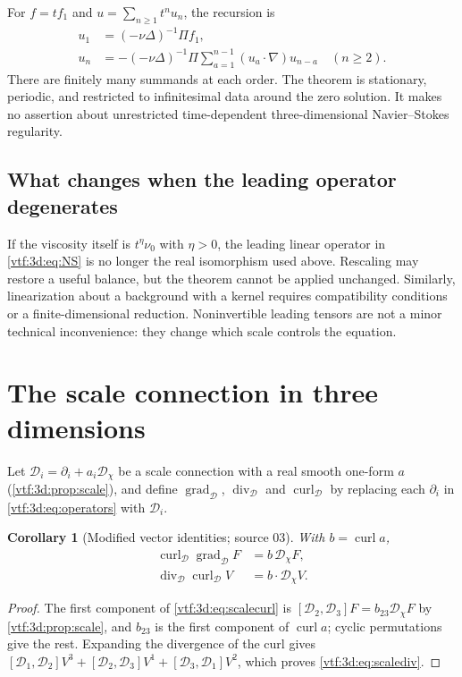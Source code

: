 \documentclass[11pt,letterpaper]{article}
\newtheorem{corollary}[theorem]{Corollary}
\theoremstyle{definition}
\theoremstyle{remark}
\newcommand{\grad}{\operatorname{grad}}\newcommand{\Div}{\operatorname{div}}
\newcommand{\curl}{\operatorname{curl}}
\begin{document}
For $f=tf_1$ and $u=\sum_{n\geq1}t^nu_n$, the recursion is
\begin{align}
 u_1&=(-\nu\Delta)^{-1}\Pi f_1,\\
 u_n&=-(-\nu\Delta)^{-1}\Pi
       \sum_{a=1}^{n-1}(u_a\cdot\nabla)u_{n-a}\quad(n\geq2).
\end{align}
There are finitely many summands at each order. The theorem is stationary, periodic, and restricted to infinitesimal data around the zero solution. It makes no assertion about unrestricted time-dependent three-dimensional Navier--Stokes regularity.

\subsection{What changes when the leading operator degenerates}
If the viscosity itself is $t^\eta\nu_0$ with $\eta>0$, the leading linear operator in \eqref{vtf:3d:eq:NS} is no longer the real isomorphism used above. Rescaling may restore a useful balance, but the theorem cannot be applied unchanged. Similarly, linearization about a background with a kernel requires compatibility conditions or a finite-dimensional reduction. Noninvertible leading tensors are not a minor technical inconvenience: they change which scale controls the equation.

\section{The scale connection in three dimensions}\label{vtf:3d:sec:scaleconnection}

Let $\mathcal D_i=\partial_i+a_i\mathscr D_\chi$ be a scale connection with a real
smooth one-form $a$ (\cref{vtf:3d:prop:scale}), and define
$\grad_{\mathcal D}$, $\Div_{\mathcal D}$ and $\curl_{\mathcal D}$ by replacing
each $\partial_i$ in \eqref{vtf:3d:eq:operators} with $\mathcal D_i$.

\begin{corollary}[Modified vector identities; source 03]\label{vtf:3d:cor:scalevector}
With $b=\curl a$,
\begin{align}
 \curl_{\mathcal D}\grad_{\mathcal D}F&=b\,\mathscr D_\chi F,\label{vtf:3d:eq:scalecurl}\\
 \Div_{\mathcal D}\curl_{\mathcal D}V&=b\cdot\mathscr D_\chi V.\label{vtf:3d:eq:scalediv}
\end{align}
\end{corollary}
\begin{proof}
The first component of \eqref{vtf:3d:eq:scalecurl} is
$[\mathcal D_2,\mathcal D_3]F=b_{23}\mathscr D_\chi F$ by \cref{vtf:3d:prop:scale},
and $b_{23}$ is the first component of $\curl a$; cyclic permutations give the
rest. Expanding the divergence of the curl gives
$[\mathcal D_1,\mathcal D_2]V^3+[\mathcal D_2,\mathcal D_3]V^1+[\mathcal
D_3,\mathcal D_1]V^2$, which proves \eqref{vtf:3d:eq:scalediv}.
\end{proof}
\end{document}
